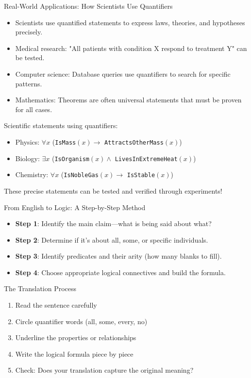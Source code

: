 \documentclass{beamer}
\begin{document}
	\begin{frame}{Real-World Applications: How Scientists Use Quantifiers}
		\begin{itemize}
			\item Scientists use quantified statements to express laws, theories, and hypotheses precisely.
			\item Medical research: "All patients with condition X respond to treatment Y" can be tested.
			\item Computer science: Database queries use quantifiers to search for specific patterns.
			\item Mathematics: Theorems are often universal statements that must be proven for all cases.
		\end{itemize}
		
		\begin{example}
			Scientific statements using quantifiers:
			\begin{itemize}
				\item Physics: $\forall x$ (\texttt{IsMass}$(x) \rightarrow$ \texttt{AttractsOtherMass}$(x)$)
				\item Biology: $\exists x$ (\texttt{IsOrganism}$(x) \land$ \texttt{LivesInExtremeHeat}$(x)$)
				\item Chemistry: $\forall x$ (\texttt{IsNobleGas}$(x) \rightarrow$ \texttt{IsStable}$(x)$)
			\end{itemize}
			These precise statements can be tested and verified through experiments!
		\end{example}
	\end{frame}
	
	\begin{frame}{From English to Logic: A Step-by-Step Method}
		\begin{itemize}
			\item \textbf{Step 1}: Identify the main claim—what is being said about what?
			\item \textbf{Step 2}: Determine if it's about all, some, or specific individuals.
			\item \textbf{Step 3}: Identify predicates and their arity (how many blanks to fill).
			\item \textbf{Step 4}: Choose appropriate logical connectives and build the formula.
		\end{itemize}
		
		\begin{block}{The Translation Process}
			\begin{enumerate}
				\item Read the sentence carefully
				\item Circle quantifier words (all, some, every, no)
				\item Underline the properties or relationships  
				\item Write the logical formula piece by piece
				\item Check: Does your translation capture the original meaning?
			\end{enumerate}
		\end{block}
	\end{frame}
	
\end{document}
